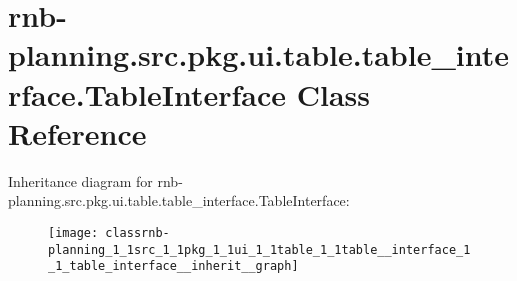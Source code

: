 \hypertarget{classrnb-planning_1_1src_1_1pkg_1_1ui_1_1table_1_1table__interface_1_1_table_interface}{}\section{rnb-\/planning.src.\+pkg.\+ui.\+table.\+table\+\_\+interface.\+Table\+Interface Class Reference}
\label{classrnb-planning_1_1src_1_1pkg_1_1ui_1_1table_1_1table__interface_1_1_table_interface}


Inheritance diagram for rnb-\/planning.src.\+pkg.\+ui.\+table.\+table\+\_\+interface.\+Table\+Interface\+:
\nopagebreak
\begin{figure}[H]
\begin{center}
\leavevmode
\texttt{[image: classrnb-planning\_1\_1src\_1\_1pkg\_1\_1ui\_1\_1table\_1\_1table\_\_interface\_1\_1\_table\_interface\_\_inherit\_\_graph]}
\end{center}
\end{figure}
